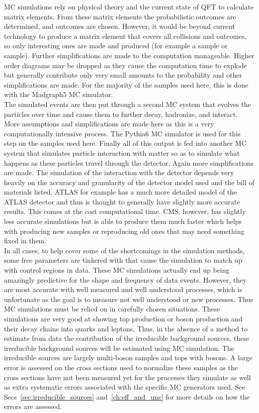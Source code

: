 	MC simulations rely on physical theory and the current state of QFT to calculate matrix elements. From these matrix elements the probabilistic outcomes are determined, and outcomes are chosen. However, it would be beyond current technology to produce a matrix element that covers all collisions and outcomes, so only interesting ones are made and produced (for example a \ttZ sample or \WZZ sample). Further simplifications are made to the computation manageable. Higher order diagrams may be dropped as they cause the computation time to explode but generally contribute only very small amounts to the probability and other simplifications are made. For the majority of the samples used here, this is done with the Madgraph5 MC simulator.\\
	
	The simulated events are then put through a second MC system that evolves the particles over time and cause them to further decay, hadronize, and interact. More assumptions and simplifications are made here as this is a very computationally intensive process. The Pythia6 MC simulator is used for this step on the samples used here. Finally  all of this output is fed into another MC system that simulates particle interaction with matter so as to simulate what happens as these particles travel through the detector. Again more simplifications are made. The simulation of the interaction with the detector depends very heavily on the accuracy and granularity of the detector model used and the bill of materials listed. ATLAS for example has a much more detailed model of the ATLAS detector and thus is thought to generally have slightly more accurate results. This comes at the cost computational time. CMS, however, has slightly less accurate simulations but is able to produce them much faster which helps with producing new samples or reproducing old ones that may need something fixed in them.\\
	
	In all cases, to help cover some of the shortcomings in the simulation methods, some free parameters are tinkered with that cause the simulation to match up with control regions in data. These MC simulations actually end up being amazingly predictive for the shape and frequency of data events. However, they are most accurate with well measured and well understood processes, which is unfortunate as the goal is to measure not well understood or new processes. Thus MC simulations must be relied on in carefully chosen situations. These simulations are very good at showing top production or boson production and their decay chains into quarks and leptons. Thus, in the absence of a method to estimate from data the contribution of the irreducible background sources, these irreducible background sources will be estimated using MC simulation. The irreducible sources are largely multi-boson samples and tops with bosons. A large error is assessed on the cross sections used to normalize these samples as the cross sections have not been measured yet for the processes they simulate as well as extra systematic errors associated with the specific MC generators used. See Secs~\ref{sec:irreducible_sources} and~\ref{ch:eff_and_unc} for more details on how the errors are assessed.
	
